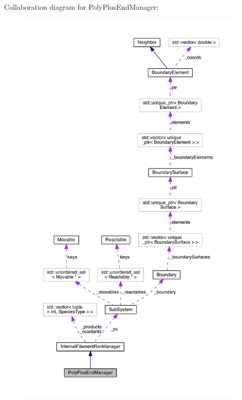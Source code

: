 Collaboration diagram for Poly\+Plus\+End\+Manager\+:\nopagebreak
\begin{figure}[H]
\begin{center}
\leavevmode
\includegraphics[height=550pt]{classPolyPlusEndManager__coll__graph}
\end{center}
\end{figure}
